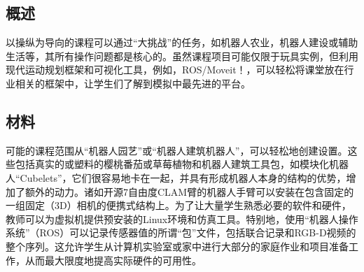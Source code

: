 \subsection{概述}
以操纵为导向的课程可以通过“大挑战”的任务，如机器人农业，机器人建设或辅助生活等，其所有操作问题都是核心的。虽然课程项目可能仅限于玩具实例，但利用现代运动规划框架和可视化工具，例如，ROS/Moveit！，可以轻松将课堂放在行业相关的框架中，让学生们了解到模拟中最先进的平台。


\subsection{材料}
可能的课程范围从“机器人园艺”或“机器人建筑机器人”，可以轻松地创建设置。这些包括真实的或塑料的樱桃番茄或草莓植物和机器人建筑工具包，如模块化机器人“Cubelets”，它们很容易地卡在一起，并具有形成机器人本身的结构的优势，增加了额外的动力。诸如开源7自由度CLAM臂的机器人手臂可以安装在包含固定的一组固定（3D）相机的便携式结构上。为了让大量学生熟悉必要的软​​件和硬件，教师可以为虚拟机提供预安装的Linux环境和仿真工具。特别地，使用“机器人操作系统”（ROS）可以记录传感器值的所谓“包”文件，包括联合记录和RGB-D视频的整个序列。这允许学生从计算机实验室或家中进行大部分的家庭作业和项目准备工作，从而最大限度地提高实际硬件的可用性。

